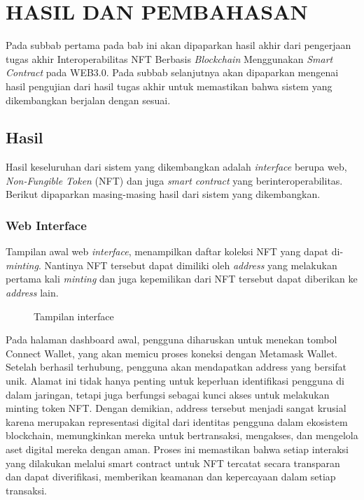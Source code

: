 \chapter{HASIL DAN PEMBAHASAN}
Pada subbab pertama pada bab ini akan dipaparkan hasil akhir dari pengerjaan tugas akhir Interoperabilitas NFT Berbasis \emph{Blockchain} Menggunakan \emph{Smart Contract} pada WEB3.0. Pada subbab selanjutnya akan dipaparkan mengenai hasil pengujian dari hasil tugas akhir untuk memastikan bahwa sistem yang dikembangkan berjalan dengan sesuai.

\section{Hasil}
Hasil keseluruhan dari sistem yang dikembangkan adalah \emph{interface} berupa web, \emph{Non-Fungible Token} (NFT) dan juga \emph{smart contract} yang berinteroperabilitas. Berikut dipaparkan masing-masing hasil dari sistem yang dikembangkan.

\subsection{Web Interface}
Tampilan awal web \emph{interface}, menampilkan daftar koleksi NFT yang dapat di-\emph{minting}. Nantinya NFT tersebut dapat dimiliki oleh \emph{address} yang melakukan pertama kali \emph{minting} dan juga kepemilikan dari NFT tersebut dapat diberikan ke \emph{address} lain.
\begin{figure} [H] \centering
  \caption{Tampilan interface}
  \label{fig:interface}
\end{figure}

Pada halaman dashboard awal, pengguna diharuskan untuk menekan tombol Connect Wallet, yang akan memicu proses koneksi dengan Metamask Wallet. Setelah berhasil terhubung, pengguna akan mendapatkan address yang bersifat unik. Alamat ini tidak hanya penting untuk keperluan identifikasi pengguna di dalam jaringan, tetapi juga berfungsi sebagai kunci akses untuk melakukan minting token NFT. Dengan demikian, address tersebut menjadi sangat krusial karena merupakan representasi digital dari identitas pengguna dalam ekosistem blockchain, memungkinkan mereka untuk bertransaksi, mengakses, dan mengelola aset digital mereka dengan aman. Proses ini memastikan bahwa setiap interaksi yang dilakukan melalui smart contract untuk NFT tercatat secara transparan dan dapat diverifikasi, memberikan keamanan dan kepercayaan dalam setiap transaksi.


